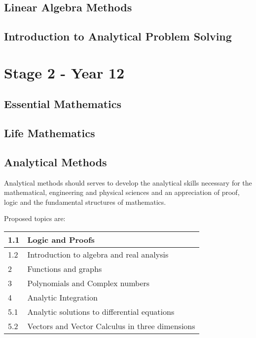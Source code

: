 \documentclass[12pt]{report}
\begin{document}
\subsection{Linear Algebra Methods}
\subsection{Introduction to Analytical Problem Solving}

\section{Stage 2 - Year 12}

\subsection{Essential Mathematics}
\subsection{Life Mathematics}
\subsection{Analytical Methods}
    Analytical methods should serves to develop the analytical skills necessary for the mathematical, engineering and physical sciences and an appreciation of proof, logic and the fundamental structures of mathematics.

    Proposed topics are:
    \begin{table}[H]
        \centering
        \begin{tabular}{|l|l|}
        \hline
            1.1 & Logic and Proofs \\ \hline
            1.2 & Introduction to algebra and real analysis \\ \hline
            2 & Functions and graphs \\ \hline 
            3 & Polynomials and Complex numbers \\ \hline
            4 & Analytic Integration  \\ \hline 
            5.1 & Analytic solutions to differential equations \\ \hline
            5.2 & Vectors and Vector Calculus in three dimensions\\ \hline
        \end{tabular}
    \end{table}
\end{document}

